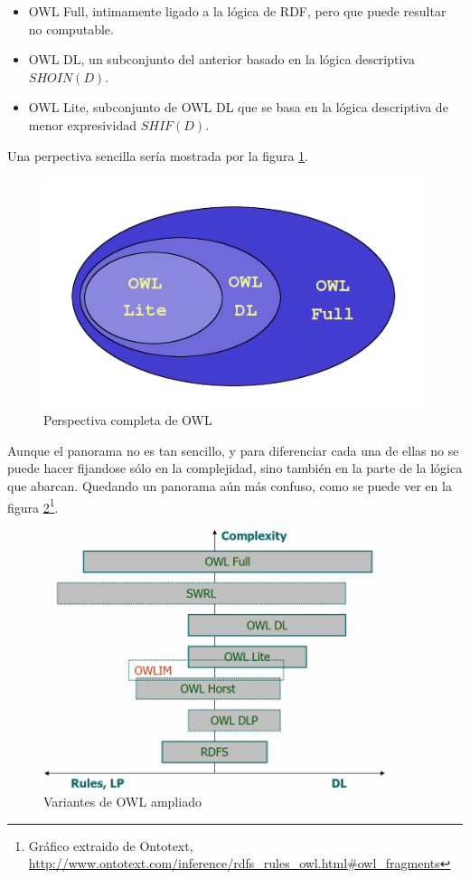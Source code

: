 \begin{itemize}
  \item OWL Full, intimamente ligado a la lógica de RDF, pero que puede resultar
	no computable.
  \item OWL DL, un subconjunto del anterior basado en la lógica descriptiva 
	${SHOIN} (D)$.
  \item OWL Lite, subconjunto de OWL DL que se basa en la lógica descriptiva 
	de menor expresividad ${SHIF} (D)$.
\end{itemize}

Una perpectiva sencilla sería mostrada por la figura \ref{fig:owlVariants}.

\begin{figure}[tp]
	\centering
	\includegraphics[width=12cm]{images/owl-variants.png}
	\caption{Perspectiva completa de OWL}
	\label{fig:owlVariants}
\end{figure}

Aunque el panorama no es tan sencillo, y para diferenciar cada una de ellas no
se puede hacer fijandose sólo en la complejidad, sino también en la parte de la 
lógica que abarcan. Quedando un panorama aún más confuso, como se puede ver en 
la figura \ref{fig:owlVariantsExtended}\footnote{Gráfico extraido de Ontotext, 
\url{http://www.ontotext.com/inference/rdfs_rules_owl.html#owl_fragments}}.

\begin{figure}[tp]
	\centering
	\includegraphics[width=10cm]{images/owl-dialects.png}
	\caption{Variantes de OWL ampliado}
	\label{fig:owlVariantsExtended}
\end{figure}

